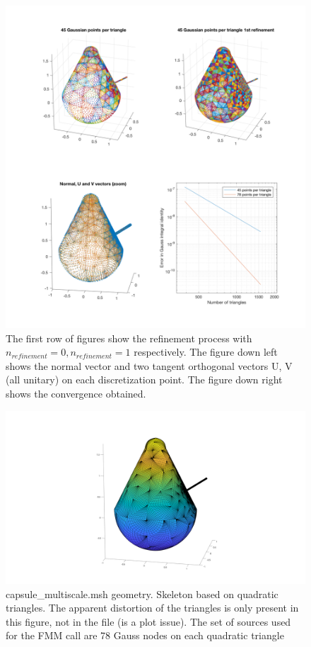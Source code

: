 \documentclass[11pt, oneside]{article}   	%
\begin{document}
\begin{figure}[H]
\begin{center}
\includegraphics[width=5.5in]{capsule_multiscale.pdf}
\end{center}
\caption{The first row of figures show the refinement process with $n_{refinement}=0, n_{refinement}=1$ respectively.
The figure down left shows the normal vector and two tangent orthogonal vectors U, V (all unitary) on each discretization point. The figure down right shows the convergence obtained. }
\label{capsule_multiscale}
\end{figure}


\begin{figure}[H]
\begin{center}
\includegraphics[width=6in]{capsule_multiscale_skeleton.pdf}
\end{center}
\caption{capsule\_multiscale.msh geometry. Skeleton based on quadratic triangles. The apparent distortion of the triangles is only present in this figure, not in the file (is a plot issue). The set of sources used for the FMM call are 78 Gauss nodes on each quadratic triangle}
\label{capsule_multiscale_skeleton}
\end{figure}
\end{document}
